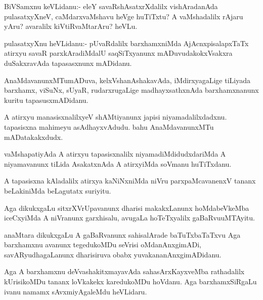 \documentclass{article}
\begin{document}

\begin{mn}%
BiVSamxnu keVLidanu:- eleY savaRshAsatxrXdalilx vishAradanAda
pulasatxyXneV, caMdarxvaMshavu heVge huTiTxtu? A vaMshadalilx rAjaru
yAru? avaralilx kiVtiRvaMtarAru? heVLu.
\end{mn}

\begin{mn}
pulasatxyXnu heVLidanu:- pUvaRdalilx barxhamxniMda AjAcnxpisalapxTaTx
atirxyu savaR parxkAradiMdalU saqSiTxyanunx mADuvudakokxVsakxra
duSakxravAda tapasasxnunx mADidanu.
\end{mn}

\begin{mn}
AnaMdavanunxMTumADuva, kelxVshanAshakavAda, iMdirxyagaLige tiLiyada
barxhamx, viSuNx, sUyaR, rudarxrugaLige madhayxsathxnAda
barxhamxnanunx kuritu tapasusxmADidanu.
\end{mn}

\begin{mn}%
A atirxyu manasisxnalilxyeV shAMtiyanunx japisi
niyamadalilxdadxnu. tapasisxna mahimeyu asAdhayxvAdudu. bahu
AnaMdavanunxMTu mADatakakxdudx.
\end{mn}

\begin{mn}
vaMshapatiyAda A atirxyu tapasisxnalilx niyamadiMdidudxdariMda A
niyamavanunx tiLida AsakatxnAda A atirxyiMda soVmanu huTiTxdanu.
\end{mn}

\begin{mn}
A tapasisxna kAladalilx atirxya kaNiNxniMda niVru parxpaMcavanenxV
tananx beLakiniMda beLagutatx suriyitu.
\end{mn}

\begin{mn}
Aga dikukxgaLu sitxrXVrUpavanunx dharisi makakxLanunx hoMdabeVkeMba
iceCxyiMda A niVranunx garxhisalu, avugaLa hoTeTxyalilx gaBaRvuuMTAyitu.
\end{mn}

\begin{mn}
anaMtara dikukxgaLu A gaBaRvanunx sahisalArade baTuTxbaTaTxvu Aga
barxhamxnu avanunx tegedukoMDu seVrisi oMdanAnxgimADi,
savARyudhagaLanunx dharisiruva obabx yuvakananAnxgimADidanu.
\end{mn}

\begin{mn}%
Aga A barxhamxnu deVvashakitxmayavAda sahasArxKayxveMba rathadalilx
kUrisikoMDu tananx loVkakekx karedukoMDu hoVdanu. Aga barxhamxSiRgaLu
ivanu namamx sAvxmiyAgaleMdu heVLidaru.
\end{mn}
\end{document}
